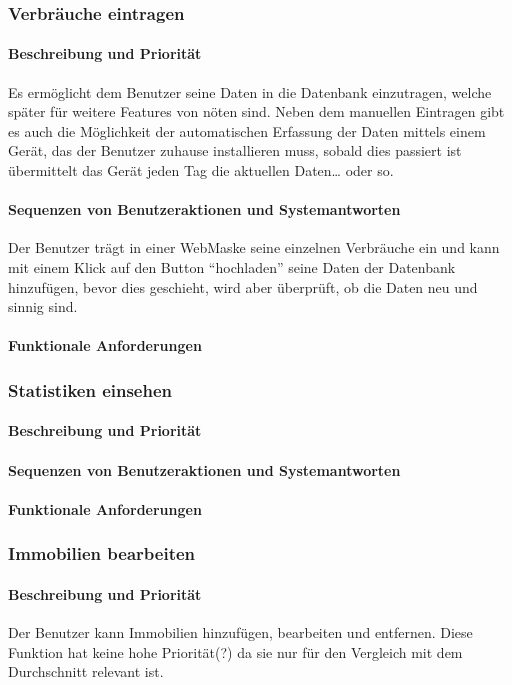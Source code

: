 \subsubsection{Verbräuche eintragen}
\paragraph{Beschreibung und Priorität}
Es ermöglicht dem Benutzer seine Daten in die Datenbank einzutragen, welche später für weitere Features von nöten sind. Neben dem manuellen Eintragen gibt es auch die Möglichkeit der automatischen Erfassung der Daten mittels einem Gerät, das der Benutzer zuhause installieren muss, sobald dies passiert ist übermittelt das Gerät jeden Tag die aktuellen Daten… oder so.

\paragraph{Sequenzen von Benutzeraktionen und Systemantworten}
Der Benutzer trägt in einer WebMaske seine einzelnen Verbräuche ein und kann mit einem Klick auf den Button “hochladen” seine Daten der Datenbank hinzufügen, bevor dies geschieht, wird aber überprüft, ob die Daten neu und sinnig sind.
\paragraph{Funktionale Anforderungen}

\subsubsection{Statistiken einsehen}
\paragraph{Beschreibung und Priorität}
\paragraph{Sequenzen von Benutzeraktionen und Systemantworten}
\paragraph{Funktionale Anforderungen}

\subsubsection{Immobilien bearbeiten}
\paragraph{Beschreibung und Priorität}
Der Benutzer kann Immobilien hinzufügen,
bearbeiten und entfernen. %
Diese Funktion hat keine hohe Priorität(?) da sie nur für den Vergleich mit dem Durchschnitt relevant ist. 
